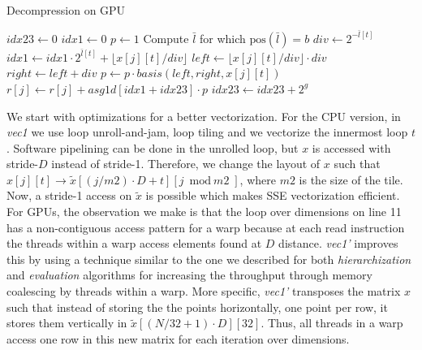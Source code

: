 \begin{algorithm}[t]
\small{
	\caption{Decompression on GPU}
	\label{alg:evaluation}
	\begin{algorithmic}[1]
    		    \State $\textit{idx23} \leftarrow 0$
						\State $\textit{idx1} \leftarrow 0$
						\State $\textit{p} \leftarrow 1$
							\State Compute $\bar{l}$ for which $\text{pos}(\bar{l}) = b$
						\EndIf
							\State $div \leftarrow 2^{-\bar{l}[t]}$
							\State $\textit{idx1} \leftarrow \textit{idx1} \cdot 2^{\bar{l}[t]} + \lfloor	x[j][t] / div \rfloor$
							\State $left \leftarrow \lfloor x[j][t] / div \rfloor \cdot div$
							\State $right \leftarrow left + div$
							\State $p \leftarrow p \cdot basis(left, right, x[j][t])$
						\EndFor
						\State $r[j] \leftarrow r[j] + \textit{asg1d}[\textit{idx1}	+\textit{idx23}] \cdot p$ 
						\State $\textit{idx23} \leftarrow \textit{idx23} + 2^g$
					\EndFor
				\EndFor
    		\EndFor
    	\EndProcedure
 	\end{algorithmic}
}
\end{algorithm}

We start with optimizations for a better vectorization. For the CPU version,
in \textit{vec1} we use loop unroll-and-jam, loop tiling and we vectorize the
innermost loop $t$. Software pipelining can be done in the unrolled loop, but
$x$ is accessed with stride-$D$ instead of stride-1. Therefore, we change the
layout of $x$ such that $x[j][t] \rightarrow \tilde{x}[(j/\textit{m2}) \cdot D +
t][j \bmod \textit{m2}]$, where $\textit{m2}$ is the size of the tile. Now, a
stride-1 access on $\tilde{x}$ is possible which makes SSE vectorization
efficient. For GPUs, the observation we make is that the loop over dimensions on
line 11 has a non-contiguous access pattern for a warp because at each read
instruction the threads within a warp access elements found at $D$ distance.
\textit{vec1'} improves this by using a technique similar to the one we
described for both \textit{hierarchization} and \textit{evaluation} algorithms
for increasing the throughput through memory coalescing by threads within a
warp. More specific, \textit{vec1'} transposes the matrix $x$ such that instead
of storing the the points horizontally, one point per row, it stores them
vertically in $\tilde{x}[(N/32+1) \cdot D][32]$. Thus, all threads in a warp
access one row in this new matrix for each iteration over dimensions.

